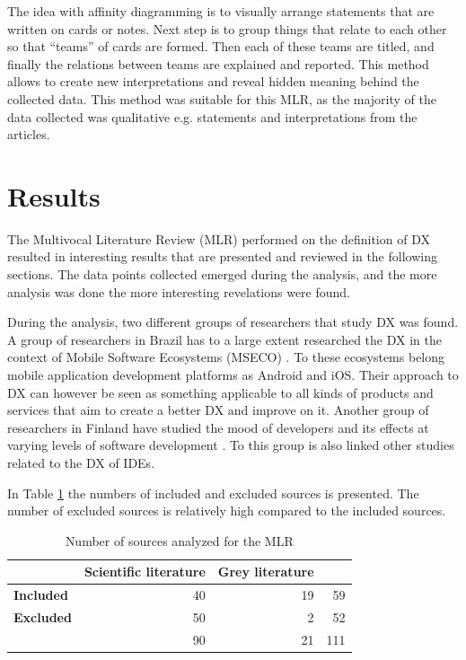 \documentclass[english, 12pt, a4paper, sci, utf8, a-1b, online]{aaltothesis}
\begin{document}
The idea with affinity diagramming is to visually arrange statements that are written on cards or notes. Next step is to group things that relate to each other so that ``teams'' of cards are formed. Then each of these teams are titled, and finally the relations between teams are explained and reported. This method allows to create new interpretations and reveal hidden meaning behind the collected data. This method was suitable for this MLR, as the majority of the data collected was qualitative e.g. statements and interpretations from the articles.

\clearpage
\section{Results} \label{section:results}

The Multivocal Literature Review (MLR) performed on the definition of DX resulted in interesting results that are presented and reviewed in the following sections. The data points collected emerged during the analysis, and the more analysis was done the more interesting revelations were found.

During the analysis, two different groups of researchers that study DX was found. A group of researchers in Brazil has to a large extent researched the DX in the context of Mobile Software Ecosystems (MSECO) \parencite{fontao2015research, fontao2016mseco, fontao2018mobile, fontao2017investigating, fontao2017facing}. To these ecosystems belong mobile application development platforms as Android and iOS. Their approach to DX can however be seen as something applicable to all kinds of products and services that aim to create a better DX and improve on it. Another group of researchers in Finland have studied the mood of developers and its effects at varying levels of software development \parencite{what-happens-when-unhappy, unhappy-developers,on-the-unhappiness, consequences-of-unhappiness}. To this group is also linked other studies related to the DX of IDEs.

In Table \ref{table:number-of-sources} the numbers of included and excluded sources is presented. The number of excluded sources is relatively high compared to the included sources.

\begin{table}[ht]
  \begin{center}
    \begin{tabular}{l | r r | r}
                        & \textbf{Scientific literature} & \textbf{Grey literature} &     \\
      \hline
      \textbf{Included} & 40                             & 19                       & 59  \\
      \textbf{Excluded} & 50                             & 2                        & 52  \\
      \hline
                        & 90                             & 21                       & 111
    \end{tabular}
    \captionsetup{width=0.6\textwidth}
    \caption{Number of sources analyzed for the MLR}
    \label{table:number-of-sources}
  \end{center}
\end{table}
\end{document}
